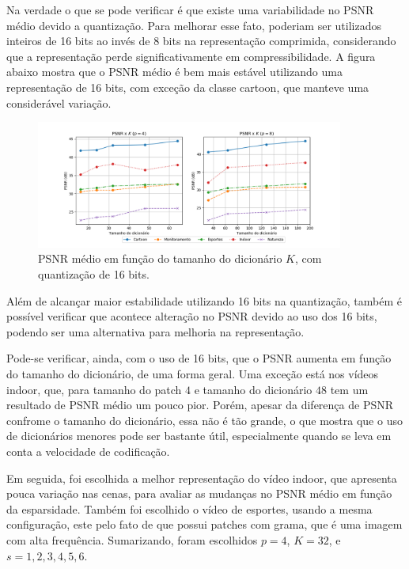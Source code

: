 \documentclass[cic,tc]{iiufrgs}
\begin{document}
Na verdade o que se pode verificar é que existe uma variabilidade no PSNR médio devido 
a quantização.
Para melhorar esse fato, poderiam ser utilizados inteiros de 16 bits ao invés de 8 bits na 
representação comprimida, considerando que a representação perde significativamente em 
compressibilidade.
A figura abaixo mostra que o PSNR médio é bem mais estável utilizando uma representação 
de 16 bits, com exceção da classe cartoon, que manteve uma considerável variação.

\begin{figure}[H]
    \caption{PSNR médio em função do tamanho do dicionário $K$, com quantização de 16 bits.}
    \begin{center}
        \includegraphics[width=0.9\textwidth]{img/graficos/ds_psnr_16bit.png}
    \end{center}
    \label{fig:psnr16bit}
\end{figure}

Além de alcançar maior estabilidade utilizando 16 bits na quantização, 
também é possível verificar que acontece alteração no PSNR devido ao uso 
dos 16 bits, podendo ser uma alternativa para melhoria na representação.

Pode-se verificar, ainda, com o uso de 16 bits, que o PSNR aumenta em função 
do tamanho do dicionário, de uma forma geral.
Uma exceção está nos vídeos indoor, que, para tamanho do patch $4$ e tamanho do dicionário $48$
tem um resultado de PSNR médio um pouco pior.
Porém, apesar da diferença de PSNR confrome o tamanho do dicionário, essa não é 
tão grande, o que mostra que o uso de dicionários menores pode ser bastante útil,
especialmente quando se leva em conta a velocidade de codificação.

Em seguida, foi escolhida a melhor representação do vídeo indoor, que apresenta 
pouca variação nas cenas, para avaliar as mudanças no PSNR médio em função da esparsidade.
Também foi escolhido o vídeo de esportes, usando a mesma configuração, este pelo fato 
de que possui patches com grama, que é uma imagem com alta frequência.
Sumarizando, foram escolhidos $p=4$, $K=32$, e $s=1,2,3,4,5,6$.
\end{document}
